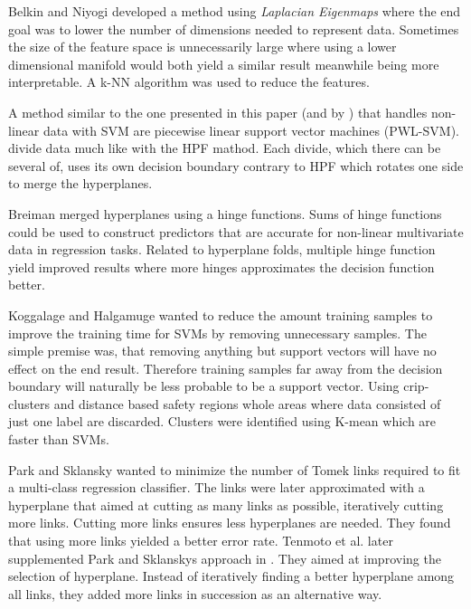 \documentclass[a4paper,twoside]{bth}
\begin{document}
\par Belkin and Niyogi \cite{Belkin:2003:LED:795523.795528} developed a method using \textit{Laplacian Eigenmaps} where the end goal was to lower the number of dimensions needed to represent data. Sometimes the size of the feature space is unnecessarily large where using a lower dimensional manifold would both yield a similar result meanwhile being more interpretable. A k-NN algorithm was used to reduce the features.

\par A method similar to the one presented in this paper (and by \cite{unpublished}) that handles non-linear data with SVM are piecewise linear support vector machines (PWL-SVM). \cite{PWLSVM} divide data much like \cite{unpublished} with the HPF mathod. Each divide, which there can be several of, uses its own decision boundary contrary to HPF which rotates one side to merge the hyperplanes.

\par Breiman \cite{hingeplane} merged hyperplanes using a hinge functions. Sums of hinge functions could be used to construct predictors that are accurate for non-linear multivariate data in regression tasks. Related to \cite{unpublished} hyperplane folds, multiple hinge function yield improved results where more hinges approximates the decision function better.

\par Koggalage and Halgamuge \cite{reducetraining} wanted to reduce the amount training samples to improve the training time for SVMs by removing unnecessary samples. The simple premise was, that removing anything but support vectors will have no effect on the end result. Therefore training samples far away from the decision boundary will naturally be less probable to be a support vector. Using crip-clusters and distance based safety regions whole areas where data consisted of just one label are discarded. Clusters were identified using K-mean which are faster than SVMs.

\par Park and Sklansky wanted to minimize the number of Tomek links required to fit a multi-class regression classifier\cite{parksklansky}. The links were later approximated with a hyperplane that aimed at cutting as many links as possible, iteratively cutting more links. Cutting more links ensures less hyperplanes are needed. They found that using more links yielded a better error rate. Tenmoto et al. later supplemented Park and Sklanskys approach in \cite{tenmoto}. They aimed at improving the selection of hyperplane. Instead of iteratively finding a better hyperplane among all links, they added more links in succession as an alternative way. 
\end{document}
